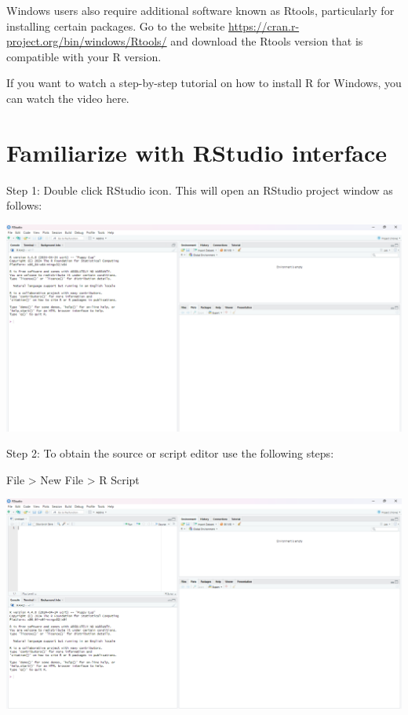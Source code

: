 \documentclass[
  letterpaper,
  DIV=11,
  numbers=noendperiod]{scrreprt}
\begin{document}
Windows users also require additional software known as Rtools,
particularly for installing certain packages. Go to the website
\url{https://cran.r-project.org/bin/windows/Rtools/} and download the
Rtools version that is compatible with your R version.

If you want to watch a step-by-step tutorial on how to install R for
Windows, you can watch the video here.

\section{Familiarize with RStudio
interface}\label{familiarize-with-rstudio-interface}

Step 1: Double click RStudio icon. This will open an RStudio project
window as follows:

\includegraphics[width=5.33in,height=\textheight,keepaspectratio]{img/chap1/rw1.png}

Step 2: To obtain the source or script editor use the following steps:

File \textgreater{} New File \textgreater{} R Script

\includegraphics[width=5.33in,height=\textheight,keepaspectratio]{img/chap1/rw2.png}
\end{document}

